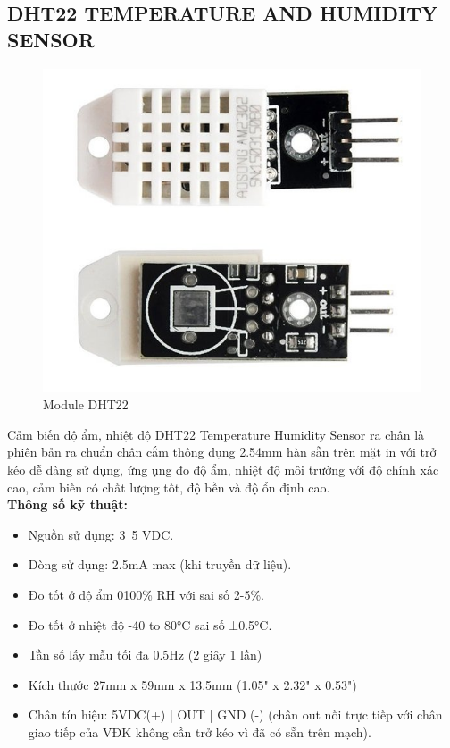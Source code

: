 \subsection{DHT22 TEMPERATURE AND HUMIDITY SENSOR}
\begin{figure}[H]
	\centering
	\includegraphics[scale=.5]{Chapter 3/image chapter 3/DHT22.jpg}
	\caption[Module DHT22]{Module DHT22}
	\label{hinh38}
\end{figure}
Cảm biến độ ẩm, nhiệt độ DHT22 Temperature Humidity Sensor ra chân là phiên bản ra chuẩn chân cắm thông dụng 2.54mm hàn sẵn trên mặt in với trở kéo dễ dàng sử dụng, ứng ụng đo độ ẩm, nhiệt độ môi trường với độ chính xác cao, cảm biến có chất lượng tốt, độ bền và độ ổn định cao.\\
\indent \textbf{Thông số kỹ thuật:}
\begin{itemize}
	\item Nguồn sử dụng: 3~5 VDC.
	\item Dòng sử dụng: 2.5mA max (khi truyền dữ liệu).
	\item Đo tốt ở độ ẩm 0100\% RH với sai số 2-5\%.
	\item Đo tốt ở nhiệt độ -40 to 80°C sai số ±0.5°C.
	\item Tần số lấy mẫu tối đa 0.5Hz (2 giây 1 lần)
	\item Kích thước 27mm x 59mm x 13.5mm (1.05" x 2.32" x 0.53")
	\item Chân tín hiệu: 5VDC(+) | OUT | GND (-) (chân out nối trực tiếp với chân giao tiếp của VĐK không cần trở kéo vì đã có sẵn trên mạch).
\end{itemize}
